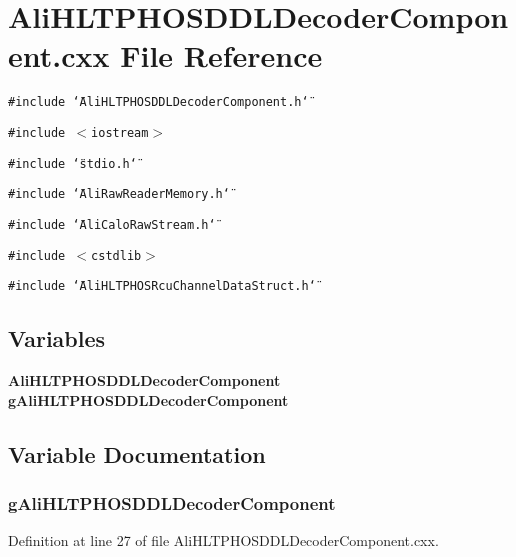 \section{Ali\-HLTPHOSDDLDecoder\-Component.cxx File Reference}
\label{AliHLTPHOSDDLDecoderComponent_8cxx}


{\tt \#include \char`\"{}Ali\-HLTPHOSDDLDecoder\-Component.h\char`\"{}}\par
{\tt \#include $<$iostream$>$}\par
{\tt \#include \char`\"{}stdio.h\char`\"{}}\par
{\tt \#include \char`\"{}Ali\-Raw\-Reader\-Memory.h\char`\"{}}\par
{\tt \#include \char`\"{}Ali\-Calo\-Raw\-Stream.h\char`\"{}}\par
{\tt \#include $<$cstdlib$>$}\par
{\tt \#include \char`\"{}Ali\-HLTPHOSRcu\-Channel\-Data\-Struct.h\char`\"{}}\par
\subsection*{Variables}
\begin{CompactItemize}
\item 
{\bf Ali\-HLTPHOSDDLDecoder\-Component} {\bf g\-Ali\-HLTPHOSDDLDecoder\-Component}
\end{CompactItemize}


\subsection{Variable Documentation}
\subsubsection{ {\bf g\-Ali\-HLTPHOSDDLDecoder\-Component}}\label{AliHLTPHOSDDLDecoderComponent_8cxx_a0}




Definition at line 27 of file Ali\-HLTPHOSDDLDecoder\-Component.cxx.